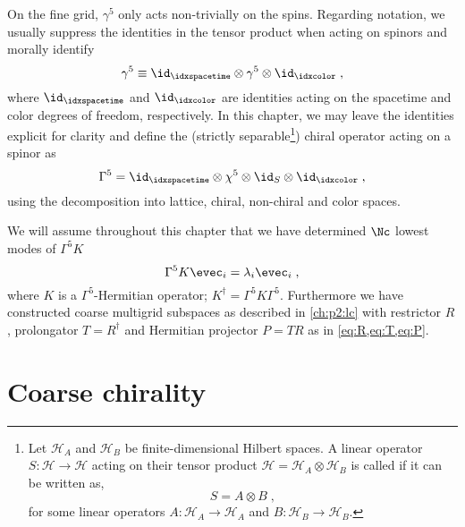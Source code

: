 On the fine grid, $\gamma^5$ only acts non-trivially on the spins.
Regarding notation, we usually suppress the identities in the tensor product when acting on spinors and morally identify
\begin{equation}
\gamma^5 \equiv \id_{\idxspacetime} \otimes \gamma^5 \otimes \id_{\idxcolor} \;,
\end{equation}
where $\id_{\idxspacetime}$ and $\id_{\idxcolor}$ are identities acting on the spacetime and color degrees of freedom, respectively.
In this chapter, we may leave the identities explicit for clarity and define the (strictly separable\footnote{Let $\mathcal{H}_A$ and $\mathcal{H}_B$ be finite-dimensional Hilbert spaces. A linear operator $S \colon \mathcal{H} \rightarrow \mathcal{H}$ acting on their tensor product $\mathcal{H} = \mathcal{H}_A \otimes \mathcal{H}_B$ is called  if it can be written as,
\begin{equation}
S = A \otimes B \;,
\end{equation}
for some linear operators $A \colon \mathcal{H}_A \rightarrow \mathcal{H}_A$ and $B \colon \mathcal{H}_B \rightarrow \mathcal{H}_B$.
}) chiral operator acting on a spinor as
\begin{equation}
\Gamma^5 = \id_{\idxspacetime} \otimes \chi^5 \otimes \id_S \otimes \id_{\idxcolor} \;,
\end{equation}
using the decomposition into lattice, chiral, non-chiral and color spaces.

We will assume throughout this chapter that we have determined $\Nc$ lowest modes of $\Gamma^{5} K$
\begin{equation} \label{eq:fine:low:modes}
\Gamma^5 K \evec_i = \lambda_i \evec_i \;,
\end{equation}
where $K$ is a $\Gamma^{5}$-Hermitian operator; $K^{\dagger} = \Gamma^{5} K \Gamma^{5}$.
Furthermore we have constructed coarse multigrid subspaces as described in \cref{ch:p2:lc} with restrictor $R$, prolongator $T=R^{\dagger}$ and Hermitian projector $P = TR$ as in \cref{eq:R,eq:T,eq:P}.


\section{Coarse chirality}
\label{sec:chirality:coarse}

